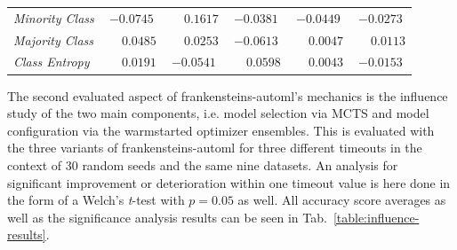 \begin{table}[ht]
\begin{subtable}{\textwidth}
\begin{tabular}{l|ccccc}
            \textit{Minority Class} & $-0.0745$ & $\phantom{-}0.1617$ & $-0.0381$ & $-0.0449$ & $-0.0273$ \\
            \textit{Majority Class} & $\phantom{-}0.0485$ & $\phantom{-}0.0253$ & $-0.0613$ & $\phantom{-}0.0047$ & $\phantom{-}0.0113$ \\
            \textit{Class Entropy} & $\phantom{-}0.0191$ & $-0.0541$ & $\phantom{-}0.0598$ & $\phantom{-}0.0043$ & $-0.0153$ \\
            \hline
        \end{tabular}
    \end{subtable}
\end{table}

The second evaluated aspect of frankensteins-automl's mechanics is the influence study of the two main components, i.e. model selection via MCTS and model configuration via the warmstarted optimizer ensembles.\newline
This is evaluated with the three variants of frankensteins-automl for three different timeouts in the context of 30 random seeds and the same nine datasets.
An analysis for significant improvement or deterioration within one timeout value is here done in the form of a Welch's \textit{t}-test with $p = 0.05$ as well.\newline
All accuracy score averages as well as the significance analysis results can be seen in Tab.~\ref{table:influence-results}.

